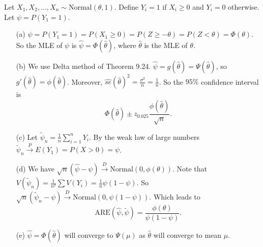 Let $X_1, X_2, ..., X_n \sim \mathrm{Normal}(\theta, 1)$.
Define $Y_i = 1$ if $X_i \geq 0$ and $Y_i = 0$ otherwise.
Let $\psi = P(Y_1 = 1)$.
\begin{itemize}
    \item[(a)] $\psi = P(Y_1 = 1) = P(X_1 \geq 0) = P(Z \geq -\theta) = P(Z < \theta) = \Phi(\theta)$.
        So the MLE of $\psi$ is $\hat{\psi} = \Phi(\hat{\theta})$, where $\hat{\theta}$ is the MLE of $\theta$.
    \item[(b)] We use Delta method of Theorem 9.24.
        $\hat{\psi} = g(\hat{\theta}) = \Psi(\hat{\theta})$, so $g'(\hat{\theta}) = \phi(\hat{\theta})$.
        Moreover, $\hat{se}(\hat{\theta})^2 = \frac{\sigma^2}{n} = \frac{1}{n}$.
        So the $95\%$ confidence interval is
        \begin{equation*}
            \Phi(\hat{\theta}) \pm z_{0.025} \frac{\phi(\hat{\theta})}{\sqrt{n}}.
        \end{equation*}
    \item[(c)] Let $\tilde{\psi}_n = \frac{1}{n} \sum_{i = 1}^{n} Y_i$.
        By the weak law of large numbers $\tilde{\psi}_n \xrightarrow{P} E(Y_1) = P(X > 0) = \psi$.
    \item[(d)] We have $\sqrt{n}(\hat{\psi} - \psi) \xrightarrow{D} \mathrm{Normal}(0, \phi(\theta))$.
        Note that $V(\tilde{\psi}_n) = \frac{1}{n^2} \sum V(Y_i) = \frac{1}{n} \psi(1 - \psi)$.
        So $\sqrt{n}(\tilde{\psi}_n - \psi) \xrightarrow{D} \mathrm{Normal}(0, \psi(1 - \psi))$.
        Which leads to
        \begin{equation*}
            \mathrm{ARE}(\hat{\psi}, \tilde{\psi}) = \frac{\phi(\theta)}{\psi(1 - \psi)}.
        \end{equation*}
    \item[(e)] $\hat{\psi} = \Phi(\hat{\theta})$ will converge to $\Psi(\mu)$ as $\hat{\theta}$ will converge to mean $\mu$.
\end{itemize}
